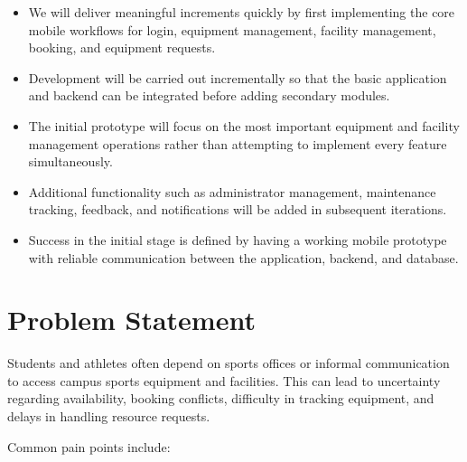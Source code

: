 \documentclass[11pt,a4paper]{article}
\begin{document}
\begin{itemize}[leftmargin=0.7cm]

    \item We will deliver meaningful increments quickly by first
    implementing the core mobile workflows for login, equipment
    management, facility management, booking, and equipment requests.

    \item Development will be carried out incrementally so that the
    basic application and backend can be integrated before adding
    secondary modules.

    \item The initial prototype will focus on the most important
    equipment and facility management operations rather than attempting
    to implement every feature simultaneously.

    \item Additional functionality such as administrator management,
    maintenance tracking, feedback, and notifications will be added in
    subsequent iterations.

    \item Success in the initial stage is defined by having a working
    mobile prototype with reliable communication between the application,
    backend, and database.

\end{itemize}


\section{Problem Statement}

Students and athletes often depend on sports offices or informal
communication to access campus sports equipment and facilities. This
can lead to uncertainty regarding availability, booking conflicts,
difficulty in tracking equipment, and delays in handling resource
requests.

Common pain points include:
\end{document}
